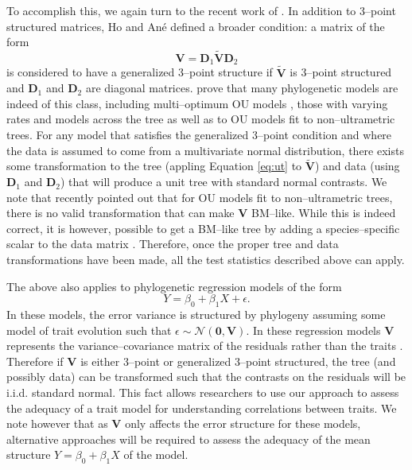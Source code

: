 \documentclass[a4paper,11pt]{article}
\begin{document}
To accomplish this, we again turn to the recent work of \citet{Ho2014}. In addition to 3--point structured matrices, Ho and An\'{e} defined a broader condition: a matrix of the form
\[\mathbf{V}=\mathbf{D}_1 \widetilde{\mathbf{V}}\mathbf{D}_2\]
is considered to have a generalized 3--point structure if $\widetilde{\mathbf{V}}$ is 3--point structured and $\mathbf{D}_1$ and $\mathbf{D}_2$ are diagonal matrices. \citet{Ho2014} prove that many phylogenetic models are indeed of this class, including multi--optimum OU models \citep{ButlerKing2004, IngramMahler2013, UyedaBayou}, those with varying rates and models across the tree \citep[e.g.,][]{Beaulieu2012} as well as to OU models fit to non--ultrametric trees. For any model that satisfies the generalized 3--point condition and where the data is assumed to come from a multivariate normal distribution, there exists some transformation to the tree (appling Equation \ref{eq:ut} to $\widetilde{\mathbf{V}}$) and data (using $\mathbf{D}_1$ and $\mathbf{D}_2$) that will produce a unit tree with standard normal contrasts. We note that \citet{Slater2014} recently pointed out that for OU models fit to non--ultrametric trees, there is no valid transformation that can make $\mathbf{V}$ BM--like. While this is indeed correct, it is however, possible to get a BM--like tree by adding a species--specific scalar to the data matrix \citep{Ho2014}. Therefore, once the proper tree and data transformations have been made, all the test statistics described above can apply.

The above also applies to phylogenetic regression models \citep{Grafen1989, Lynch1991, MartinsHansen1997} of the form
\[Y = \beta_0 + \beta_1 X + \epsilon.\]
In these models, the error variance is structured by phylogeny assuming some model of trait evolution such that $\epsilon \sim \mathcal{N}(\mathbf{0}, \mathbf{V})$. In these regression models $\mathbf{V}$ represents the variance--covariance matrix of the residuals rather than the traits \citep{Rohlf2001}. Therefore if $\mathbf{V}$ is either 3--point or generalized 3--point structured, the tree (and possibly data) can be transformed such that the contrasts on the residuals will be i.i.d. standard normal. This fact allows researchers to use our approach to assess the adequacy of a trait model for understanding correlations between traits. We note however that as $\mathbf{V}$ only affects the error structure for these models, alternative approaches \citep[see for example][ch. 6]{Gelmanbook} will be required to assess the adequacy of the mean structure $Y = \beta_0 + \beta_1X$ of the model.
\end{document}

